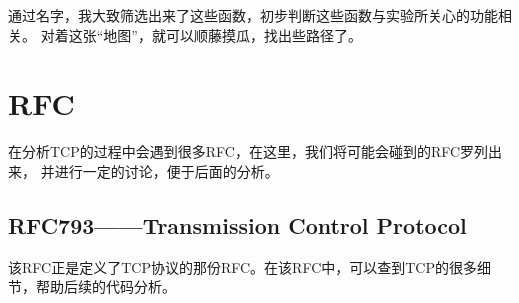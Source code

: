 通过名字，我大致筛选出来了这些函数，初步判断这些函数与实验所关心的功能相关。
对着这张``地图''，就可以顺藤摸瓜，找出些路径了。

\section{RFC}
\label{sec:rfc}

在分析TCP的过程中会遇到很多RFC，在这里，我们将可能会碰到的RFC罗列出来，
并进行一定的讨论，便于后面的分析。

\subsection{RFC793——Transmission Control Protocol}
\label{subsec:rfc793}

该RFC正是定义了TCP协议的那份RFC。在该RFC中，可以查到TCP的很多细节，帮助后续的代码分析。

